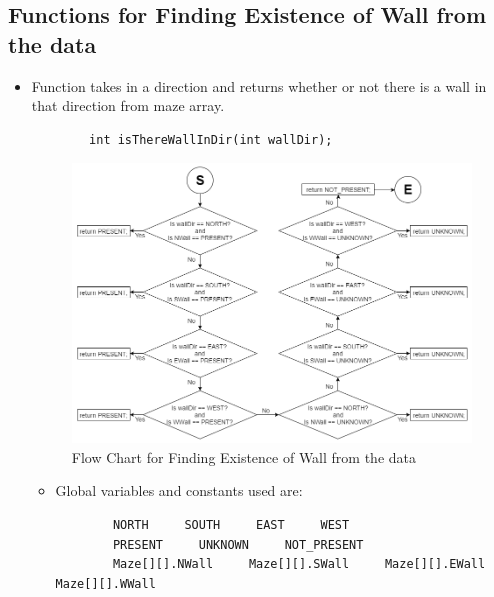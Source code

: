 \documentclass[11pt]{article}
\begin{document}
\newpage


\subsection{Functions for Finding Existence of Wall from the data}
\begin{itemize}
\item Function takes in a direction and returns whether or not there is a wall in that direction from maze array.
	\begin{verbatim}
		int isThereWallInDir(int wallDir);
	\end{verbatim}
\begin{figure}[htp]
\centering
\includegraphics[scale=0.580]{images/Software_Flowchart/isThereWallInDir.png}
\caption{Flow Chart for Finding Existence of Wall from the data}
\label{}
\end{figure}
	\begin{itemize}
	\item Global variables and constants used are:
	\begin{verbatim}
		NORTH     SOUTH     EAST     WEST
		PRESENT     UNKNOWN     NOT_PRESENT
		Maze[][].NWall     Maze[][].SWall     Maze[][].EWall     Maze[][].WWall
	\end{verbatim}
	\end{itemize}
\end{itemize}
\newpage

\end{document}
